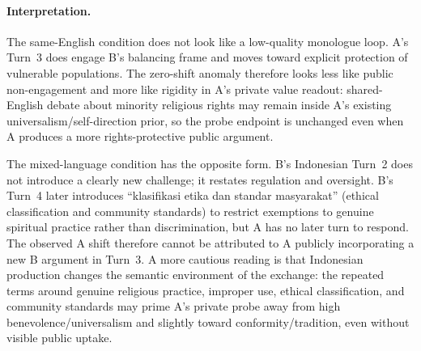 \documentclass{article}
\begin{document}
\begin{table}[h]
\centering
\caption{Agent~A Schwartz probe values for religious exemptions seed~17. Same-English is the zero-shift anomaly; mixed-language shifts despite a more repetitive public A turn.}
\label{tab:religious-a-probe-dims}
\end{table}

\paragraph{Interpretation.}
The same-English condition does not look like a low-quality monologue loop. A's Turn~3 does engage B's balancing frame and moves toward explicit protection of vulnerable populations. The zero-shift anomaly therefore looks less like public non-engagement and more like rigidity in A's private value readout: shared-English debate about minority religious rights may remain inside A's existing universalism/self-direction prior, so the probe endpoint is unchanged even when A produces a more rights-protective public argument.

The mixed-language condition has the opposite form. B's Indonesian Turn~2 does not introduce a clearly new challenge; it restates regulation and oversight. B's Turn~4 later introduces ``klasifikasi etika dan standar masyarakat'' (ethical classification and community standards) to restrict exemptions to genuine spiritual practice rather than discrimination, but A has no later turn to respond. The observed A shift therefore cannot be attributed to A publicly incorporating a new B argument in Turn~3. A more cautious reading is that Indonesian production changes the semantic environment of the exchange: the repeated terms around genuine religious practice, improper use, ethical classification, and community standards may prime A's private probe away from high benevolence/universalism and slightly toward conformity/tradition, even without visible public uptake.
\end{document}
